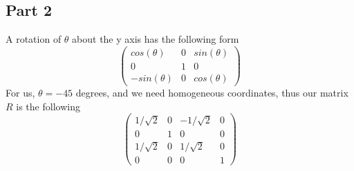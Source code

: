 \documentclass[11pt,psfig]{article}
\begin{document}
\subsection{Part 2}

A rotation of $\theta$ about the y axis has the following form
\[ \left( \begin{array}{ccc}
cos(\theta) & 0 & sin(\theta) \\
0 & 1 & 0 \\
-sin(\theta) & 0 & cos(\theta) \end{array} \right)\]
For us, $\theta=-45$ degrees, and we need homogeneous coordinates, thus our matrix $R$ is the following
\[ \left( \begin{array}{cccc}
1/\sqrt{2} & 0 & -1/\sqrt{2} & 0 \\
0 & 1 & 0 & 0\\
1/\sqrt{2} & 0 & 1/\sqrt{2} & 0 \\
0 & 0 & 0 & 1 \end{array} \right)\]
\end{document}
